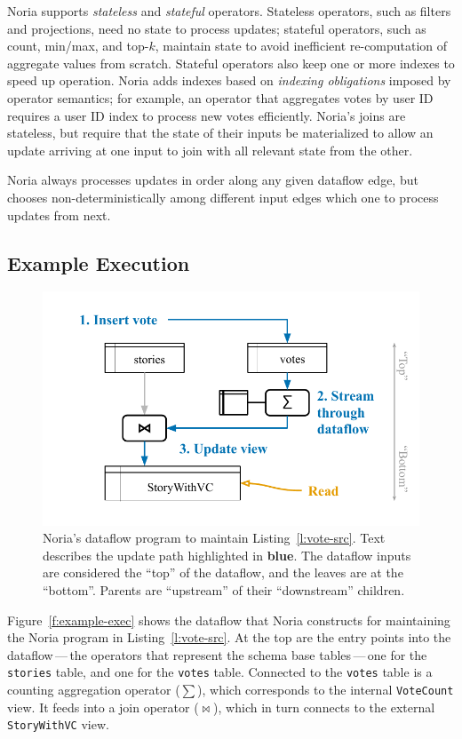 Noria supports \emph{stateless} and \emph{stateful} operators. Stateless
operators, such as filters and projections, need no state to process updates;
stateful operators, such as count, min/max, and top-$k$, maintain state to avoid
inefficient re-computation of aggregate values from scratch. Stateful operators
also keep one or more indexes to speed up operation. Noria adds indexes based on
\emph{indexing obligations} imposed by operator semantics; for example, an
operator that aggregates votes by user ID requires a user ID index to process
new votes efficiently. Noria's joins are stateless, but require that the state
of their inputs be materialized to allow an update arriving at one input to join
with all relevant state from the other.

Noria always processes updates in order along any given dataflow edge, but
chooses non-deterministically among different input edges which one to process
updates from next.

\subsection*{Example Execution}

\begin{figure}[t]
  \centering
  \includegraphics{diagrams/Example Execution.pdf}
  \caption{Noria's dataflow program to maintain Listing~\ref{l:vote-src}. Text
  describes the update path highlighted in \textbf{\color{set1}blue}. The
  dataflow inputs are considered the ``top'' of the dataflow, and the leaves are
  at the ``bottom''. Parents are ``upstream'' of their ``downstream'' children.}
  \label{f:example-exec}
\end{figure}

Figure~\vref{f:example-exec} shows the dataflow that Noria constructs for
maintaining the Noria program in Listing~\vref{l:vote-src}. At the top are the
entry points into the dataflow\,---\,the operators that represent the schema
base tables\,---\,one for the \texttt{stories} table, and one for the
\texttt{votes} table. Connected to the \texttt{votes} table is a counting
aggregation operator ($\sum$), which corresponds to the internal
\texttt{VoteCount} view. It feeds into a join operator ($\bowtie$), which in
turn connects to the external \texttt{StoryWithVC} view.

